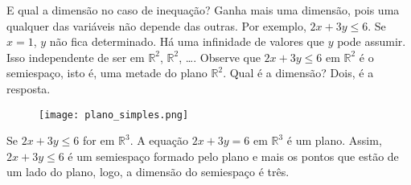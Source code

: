 E qual a dimensão no caso de inequação?
Ganha mais uma dimensão, pois uma qualquer das variáveis não depende das outras.
Por exemplo, $ 2x + 3y \leq 6 $.
Se $ x = 1 $, $y$ não fica determinado. 
Há uma infinidade de valores que $ y $ pode assumir.
Isso independente de ser em $ \mathbb{R}^{2} $, $ \mathbb{R}^{2} $, \ldots.
Observe que $ 2x + 3y \leq 6 $ em $ \mathbb{R}^{2} $ é o semiespaço, isto é,
uma metade do plano $ \mathbb{R}^{2} $.
Qual é a dimensão?
Dois, é a resposta.

\begin{figure}[!h]
  \centering
  \texttt{[image: plano\_simples.png]}
  \caption{}
  \label{fig:planoSimples}
\end{figure}

Se $ 2x + 3y \leq 6 $ for em $ \mathbb{R}^{3} $.
A equação $ 2x +3y = 6 $ em $ \mathbb{R}^{3} $ é um plano.
Assim, $ 2x + 3y \leq 6 $ é um semiespaço formado pelo plano e mais os pontos
que estão de um lado do plano, logo, a dimensão do semiespaço é três.
